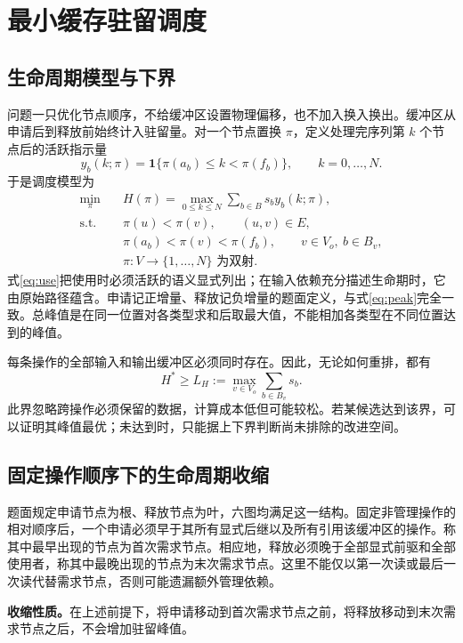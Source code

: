 \section{最小缓存驻留调度}
\subsection{生命周期模型与下界}
问题一只优化节点顺序，不给缓冲区设置物理偏移，也不加入换入换出。缓冲区从申请后到释放前始终计入驻留量。对一个节点置换 $\pi$，定义处理完序列第 $k$ 个节点后的活跃指示量
\begin{equation}
y_b(k;\pi)=\mathbf 1\{\pi(a_b)\le k<\pi(f_b)\},\qquad k=0,\ldots,N.
\end{equation}
于是调度模型为
\begin{align}
\min_{\pi}\quad&H(\pi)=\max_{0\le k\le N}\sum_{b\in B}s_b y_b(k;\pi),\label{eq:peak}\\
\text{s.t.}\quad&\pi(u)<\pi(v),\qquad (u,v)\in E,\label{eq:topo}\\
&\pi(a_b)<\pi(v)<\pi(f_b),\qquad v\in V_o,\ b\in B_v,\label{eq:use}\\
&\pi:V\longrightarrow\{1,\ldots,N\}\text{ 为双射}.\nonumber
\end{align}
式\eqref{eq:use}把使用时必须活跃的语义显式列出；在输入依赖充分描述生命期时，它由原始路径蕴含。申请记正增量、释放记负增量的题面定义，与式\eqref{eq:peak}完全一致。总峰值是在同一位置对各类型求和后取最大值，不能相加各类型在不同位置达到的峰值。

每条操作的全部输入和输出缓冲区必须同时存在。因此，无论如何重排，都有
\begin{equation}
H^*\ge L_H:=\max_{v\in V_o}\sum_{b\in B_v}s_b.\label{eq:hlower}
\end{equation}
此界忽略跨操作必须保留的数据，计算成本低但可能较松。若某候选达到该界，可以证明其峰值最优；未达到时，只能据上下界判断尚未排除的改进空间。

\subsection{固定操作顺序下的生命周期收缩}
题面规定申请节点为根、释放节点为叶，六图均满足这一结构。固定非管理操作的相对顺序后，一个申请必须早于其所有显式后继以及所有引用该缓冲区的操作。称其中最早出现的节点为首次需求节点。相应地，释放必须晚于全部显式前驱和全部使用者，称其中最晚出现的节点为末次需求节点。这里不能仅以第一次读或最后一次读代替需求节点，否则可能遗漏额外管理依赖。

\textbf{收缩性质。}在上述前提下，将申请移动到首次需求节点之前，将释放移动到末次需求节点之后，不会增加驻留峰值。

